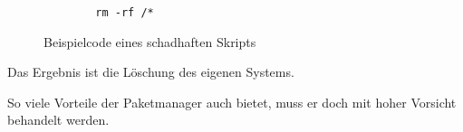 \begin{figure}[t]
	\centering
	\begin{lstlisting}
        rm -rf /*
	\end{lstlisting}
	\caption[security-npm]{Beispielcode eines schadhaften Skripts}
	\label{f:security-npm}
\end{figure}

Das Ergebnis ist die Löschung des eigenen Systems.

So viele Vorteile der Paketmanager auch bietet, muss er doch mit hoher
Vorsicht behandelt werden.
